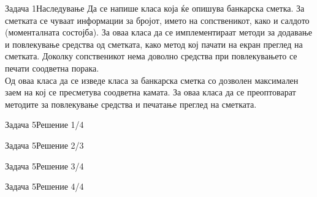 
\begin{frame}{Задача 1}{Наследување}
Да се напише класа која ќе опишува банкарска сметка. За сметката се чуваат
информации за бројот, името на сопственикот, како и салдото (моменталната
состојба). За оваа класа да се имплементираат методи за додавање и повлекување
средства од сметката, како метод кој пачати на екран преглед на сметката.
Доколку сопственикот нема доволно средства при повлекувањето се печати соодветна порака.\\
Од оваа класа да се изведе класа за банкарска сметка со дозволен максимален
заем на кој се пресметува соодветна камата. За оваа класа да се преоптоварат
методите за повлекување средства и печатање преглед на сметката.
\end{frame}

\begin{frame}[fragile]{Задача 5}{Решение 1/4}

\end{frame}

\begin{frame}[fragile]{Задача 5}{Решение 2/3}

\end{frame}

\begin{frame}[fragile]{Задача 5}{Решение 3/4}

\end{frame}

\begin{frame}[fragile]{Задача 5}{Решение 4/4}

\end{frame}
